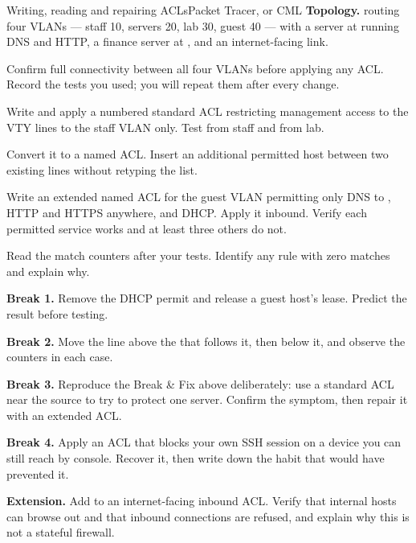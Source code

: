 \begin{lab}{Writing, reading and repairing ACLs}{Packet Tracer, or CML}
\textbf{Topology.}  routing four VLANs --- staff 10, servers 20, lab 30,
guest 40 --- with a server at  running DNS and HTTP, a finance
server at , and an internet-facing link.

\begin{tasks}
  \item Confirm full connectivity between all four VLANs before applying any ACL.
        Record the tests you used; you will repeat them after every change.
  \item Write and apply a numbered standard ACL restricting management access to
        the VTY lines to the staff VLAN only. Test from staff and from lab.
  \item Convert it to a named ACL. Insert an additional permitted host between
        two existing lines without retyping the list.
  \item Write an extended named ACL for the guest VLAN permitting only DNS to
        , HTTP and HTTPS anywhere, and DHCP. Apply it inbound.
        Verify each permitted service works and at least three others do not.
  \item Read the match counters after your tests. Identify any rule with zero
        matches and explain why.
  \item \textbf{Break 1.} Remove the DHCP permit and release a guest host's
        lease. Predict the result before testing.
  \item \textbf{Break 2.} Move the  line above the
         that follows it, then below it, and observe the counters in
        each case.
  \item \textbf{Break 3.} Reproduce the Break \& Fix above deliberately: use a
        standard ACL near the source to try to protect one server. Confirm the
        symptom, then repair it with an extended ACL.
  \item \textbf{Break 4.} Apply an ACL that blocks your own SSH session on a
        device you can still reach by console. Recover it, then write down the
        habit that would have prevented it.
  \item \textbf{Extension.} Add  to an internet-facing inbound ACL. Verify that internal
        hosts can browse out and that inbound connections are refused, and
        explain why this is not a stateful firewall.
\end{tasks}
\end{lab}

